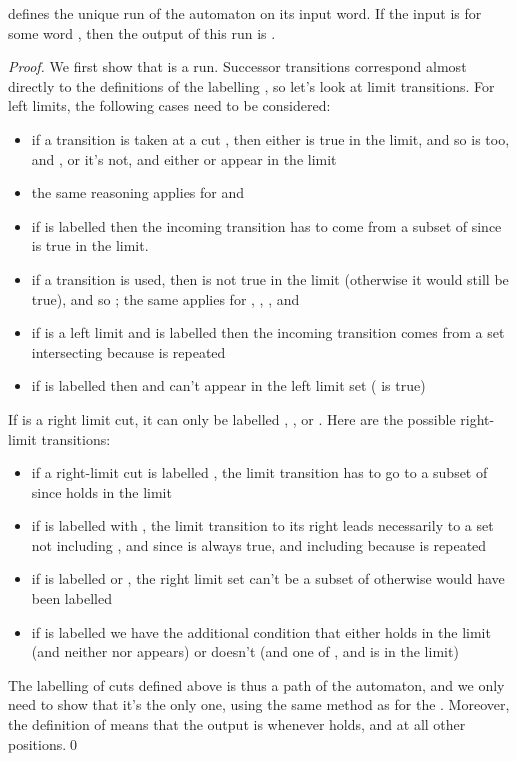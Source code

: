 \documentclass[envcountsame]{fsttcs-ps}
\begin{document}
\begin{lemma}
 defines the unique run of the automaton on its input word.  If the
input is  for some word , then the
output of this run is .
\end{lemma}
\begin{proof}
We first show that  is a run.  Successor transitions correspond almost
directly to the definitions of the labelling , so let's look at limit
transitions.  For left limits, the following cases need to be considered:
\begin{itemize}
\item if a transition  is taken at a cut , then either
 is true in the limit, and so  is too, and , or it's not, and either  or  appear
in the limit
\item the same reasoning applies for  and 
\item if  is labelled  then the incoming transition has to come
from a subset of  since  is true in
the limit.
\item if a transition  is used, then  is
not true in the limit (otherwise it would still be true), and so
; the same applies for ,
, ,  and 
\item if  is a left limit and is labelled  then the incoming
transition comes from a set  intersecting  because
 is repeated
\item if  is labelled  then  and  can't appear in
the left limit set ( is true)
\end{itemize}
If  is a right limit cut, it can only be labelled 
, ,  or .
Here are the possible right-limit transitions:
\begin{itemize}
\item if a right-limit cut  is labelled , the
limit transition has to go to a subset of  since
 holds in the limit
\item if  is labelled with , the limit transition to its right
leads necessarily to a set  not including ,  and 
since  is always true, and including  because  is
repeated
\item if  is labelled  or , the right limit set can't be a
subset of  otherwise  would have been labelled

\item if  is labelled  we have the additional condition that
either  holds in the limit (and neither  nor  appears)
or  doesn't (and one of ,  and  is in the limit)
\end{itemize}

The labelling of cuts defined above is thus a path of the automaton, and we
only need to show that it's the only one, using the same method as for the
.  Moreover, the definition of  means that the output
is  whenever  holds, and  at all other positions.\qed\end{proof}
\end{document}
